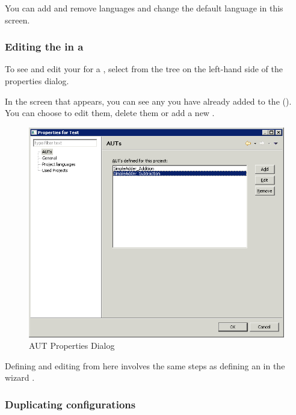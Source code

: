 You can add and remove \gdproject{} languages and change the default language in this screen. 
 


\subsubsection{Editing the \gdauts{} in a \gdproject{}}
\label{ProjPropertiesEditAUT}

To see and edit your \gdauts{} for a \gdproject{},  select  from the tree on the left-hand side of the \gdproject{} properties dialog. 

In the screen that appears, you can see any \gdauts{} you have already added to the \gdproject{} (). You can choose to edit them, delete them or add a new \gdaut{}. 

\begin{figure}[h]
\begin{center}
\includegraphics[width=12.5cm]{Tasks/Projects/PS/autsettingsdialog}
\caption{AUT Properties Dialog}
\label{autsettingsdialog}
\end{center}
\end{figure}

Defining and editing \gdauts{} from here involves the same steps as defining  an \gdaut{} in the \gdproject{} wizard . 

\subsubsection{Duplicating \gdaut{} configurations}

